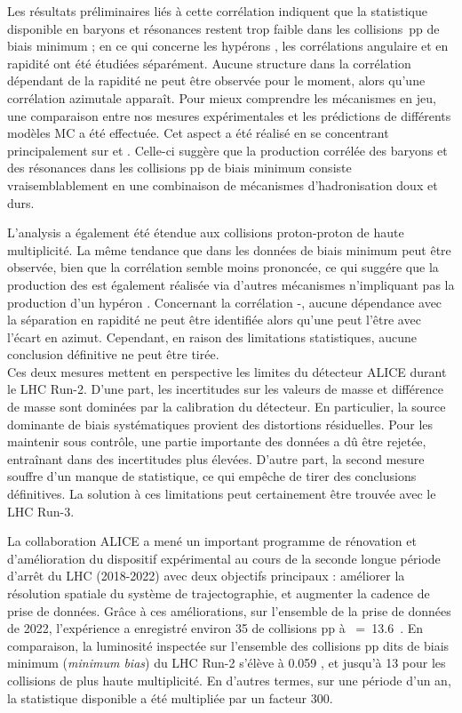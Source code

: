 Les résultats préliminaires liés à cette corrélation indiquent que la statistique disponible en baryons \rmOmega et résonances \rmPhiMes restent trop faible dans les collisions~pp de biais minimum ; en ce qui concerne les hypérons \rmXi, les corrélations angulaire et en rapidité ont été étudiées séparément. Aucune structure dans la corrélation dépendant de la rapidité ne peut être observée pour le moment, alors qu'une corrélation azimutale apparaît. Pour mieux comprendre les mécanismes en jeu, une comparaison entre nos mesures expérimentales et les prédictions de différents modèles MC a été effectuée. Cet aspect a été réalisé en se concentrant principalement sur \Pythia et \EposFour. Celle-ci suggère que la production corrélée des baryons \rmXiPM et des résonances \rmPhiMes dans les collisions pp de biais minimum consiste vraisemblablement en une combinaison de mécanismes d'hadronisation doux et durs.

L'analysis a également été étendue aux collisions proton-proton de haute multiplicité. La même tendance que dans les données de biais minimum peut être observée, bien que la corrélation semble moins prononcée, ce qui suggére que la production des \rmPhiMes est également réalisée via d'autres mécanismes n'impliquant pas la production d'un hypéron \rmXiPM. Concernant la corrélation \rmOmegaPM-\rmPhiMes, aucune dépendance avec la séparation en rapidité ne peut être identifiée alors qu'une peut l'être avec l'écart en azimut. Cependant, en raison des limitations statistiques, aucune conclusion définitive ne peut être tirée.\\

Ces deux mesures mettent en perspective les limites du détecteur ALICE durant le LHC Run-2. D'une part, les incertitudes sur les valeurs de masse et différence de masse sont dominées par la calibration du détecteur. En particulier, la source dominante de biais systématiques provient des distortions résiduelles. Pour les maintenir sous contrôle, une partie importante des données a dû être rejetée, entraînant dans des incertitudes plus élevées. D'autre part, la second mesure souffre d'un manque de statistique, ce qui empêche de tirer des conclusions définitives. La solution à ces limitations peut certainement être trouvée avec le LHC Run-3.

La collaboration ALICE a mené un important programme de rénovation et d'amélioration du dispositif expérimental au cours de la seconde longue période d'arrêt du LHC (2018-2022) avec deux objectifs principaux : améliorer la résolution spatiale du système de trajectographie, et augmenter la cadence de prise de données. Grâce à ces améliorations, sur l'ensemble de la prise de données de 2022, l'expérience a enregistré environ 35 \invpb de collisions pp à \sqrtS~=~13.6~\tev \cite{cern152ndLHCCMeeting2022}. En comparaison, la luminosité inspectée sur l'ensemble des collisions pp dits de biais minimum (\textit{minimum bias}) du LHC Run-2 s'élève à 0.059 \invpb, et jusqu'à 13 \invpb pour les collisions de plus haute multiplicité. En d'autres termes, sur une période d'un an, la statistique disponible a été multipliée par un facteur 300.

